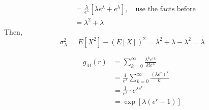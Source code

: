 \documentclass[UTF8]{article}
\begin{document}
\begin{enumerate}
\begin{equation*}
\begin{split}
                    &=\frac{\lambda}{e^\lambda}[\lambda e^\lambda+e^\lambda],\quad\text{use the facts before}\\
                    &=\lambda^2+\lambda
                \end{split}
            \end{equation*}
        Then,
        \begin{equation*}
            \sigma^2_X=E[X^2]-(E[X])^2=\lambda^2+\lambda-\lambda^2=\lambda
        \end{equation*}
        
        \begin{equation*}
            \begin{split}
                g_M(r) &=\sum^\infty_{k=0}\frac{\lambda^k e^{rk}}{k!e^\lambda}\\
                &=\frac{1}{e^\lambda}\sum^\infty_{k=0}\frac{(\lambda e^r)^k}{k!}\\
                &=\frac{1}{e^\lambda}\cdot e^{\lambda e^r}\\
                &=\exp[\lambda(e^r-1)]
            \end{split}
        \end{equation*}
    \end{enumerate}
\end{document}
